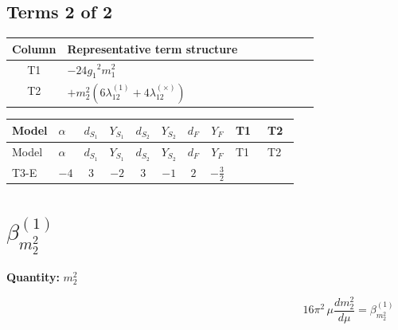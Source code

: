 \documentclass[8pt]{article}
\begin{document}
\begin{landscape}
\subsection*{Terms 2 of 2}
\begin{center}
\begin{tabular}{@{}c >{\raggedright\arraybackslash}p{0.82\linewidth}@{}}
\toprule
Column & Representative term structure \\
\midrule
T1 & \(\displaystyle -24 {g_1}^2 {m_1^2}\) \\
\midrule
T2 & \(\displaystyle +{m_2^2} (6 {\lambda_{12}^{(1)}}+4 {\lambda_{12}^{(\times)}})\) \\
\midrule
\bottomrule
\end{tabular}
\end{center}
\smallskip
\tiny
\begin{longtable}{@{}llcccccc >{\raggedright\arraybackslash}p{0.21\linewidth} >{\raggedright\arraybackslash}p{0.21\linewidth}@{}}
\toprule
Model & $\alpha$ & $d_{S_1}$ & $Y_{S_1}$ & $d_{S_2}$ & $Y_{S_2}$ & $d_F$ & $Y_F$ & T1 & T2 \\
\midrule
\endfirsthead
\toprule
Model & $\alpha$ & $d_{S_1}$ & $Y_{S_1}$ & $d_{S_2}$ & $Y_{S_2}$ & $d_F$ & $Y_F$ & T1 & T2 \\
\midrule
\endhead
T3-E & $-4$ & $3$ & $-2$ & $3$ & $-1$ & $2$ & $-\frac{3}{2}$ & \scriptsize\adjustbox{max width=\linewidth}{$\begin{gathered} -24 {g_1}^2 {m_1^2}\end{gathered}$} & \scriptsize\adjustbox{max width=\linewidth}{$\begin{gathered} +{m_2^2} (6 {\lambda_{12}^{(1)}}+4 {\lambda_{12}^{(\times)}})\end{gathered}$} \\
\midrule
\bottomrule
\end{longtable}
\clearpage
\section*{$\beta_{m_2^2}^{(1)}$}
\noindent\textbf{Quantity: }$m_2^2$\par\smallskip
\[16\pi^2\,\mu\frac{d m_2^2}{d\mu}=\beta_{m_2^2}^{(1)}\]

\end{landscape}
\end{document}

